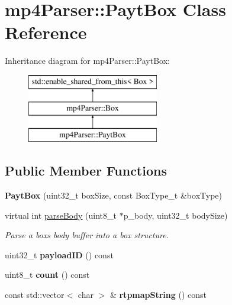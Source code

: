 \hypertarget{classmp4_parser_1_1_payt_box}{}\section{mp4\+Parser\+::Payt\+Box Class Reference}
\label{classmp4_parser_1_1_payt_box}
Inheritance diagram for mp4\+Parser\+::Payt\+Box\+:\begin{figure}[H]
\begin{center}
\leavevmode
\includegraphics[height=3.000000cm]{classmp4_parser_1_1_payt_box}
\end{center}
\end{figure}
\subsection*{Public Member Functions}
\begin{DoxyCompactItemize}
\item 
\mbox{\label{classmp4_parser_1_1_payt_box_a947542569fc8733b27173a2c8f4f4344}} 
{\bfseries Payt\+Box} (uint32\+\_\+t box\+Size, const Box\+Type\+\_\+t \&box\+Type)
\item 
virtual int \mbox{\hyperlink{classmp4_parser_1_1_payt_box_a95e5ecabf06b6fa4b3238fe2a495f9b3}{parse\+Body}} (uint8\+\_\+t $\ast$p\+\_\+body, uint32\+\_\+t body\+Size)
\begin{DoxyCompactList}\small\item\em Parse a box\textquotesingle{}s body buffer into a box structure. \end{DoxyCompactList}\item 
\mbox{\label{classmp4_parser_1_1_payt_box_acd3fafa77e372098e9e2f4bf3364e4b0}} 
uint32\+\_\+t {\bfseries payload\+ID} () const
\item 
\mbox{\label{classmp4_parser_1_1_payt_box_aeb44d2e8c80776b33790180b19b942ad}} 
uint8\+\_\+t {\bfseries count} () const
\item 
\mbox{\label{classmp4_parser_1_1_payt_box_aa87a414d11656c1af657aa2a8d0549b4}} 
const std\+::vector$<$ char $>$ \& {\bfseries rtpmap\+String} () const
\end{DoxyCompactItemize}
